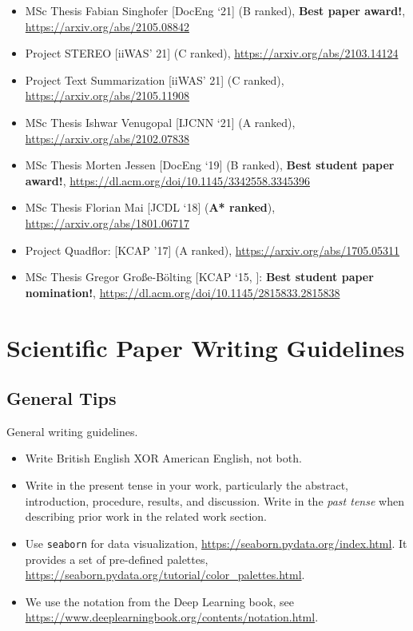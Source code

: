 \documentclass[manuscript, nonacm]{acmart}
\begin{document}
\begin{itemize}
\item MSc Thesis Fabian Singhofer [DocEng ‘21] (B ranked), \textbf{Best paper award!}, \url{https://arxiv.org/abs/2105.08842}
\item Project STEREO [iiWAS’ 21] (C ranked), \url{https://arxiv.org/abs/2103.14124}
\item Project Text Summarization [iiWAS’ 21] (C ranked), \url{https://arxiv.org/abs/2105.11908}
\item MSc Thesis Ishwar Venugopal [IJCNN ‘21] (A ranked), \url{https://arxiv.org/abs/2102.07838}
\item MSc Thesis Morten Jessen [DocEng ‘19] (B ranked), \textbf{Best student paper award!}, \url{https://dl.acm.org/doi/10.1145/3342558.3345396}
\item MSc Thesis Florian Mai [JCDL ‘18] (\textbf{A* ranked}), \url{https://arxiv.org/abs/1801.06717}
\item Project Quadflor: [KCAP '17] (A ranked), \url{https://arxiv.org/abs/1705.05311}
\item MSc Thesis Gregor Große-Bölting [KCAP ‘15, \cite{DBLP:conf/kcap/Grosse-BoltingN15}]: \textbf{Best student paper nomination!}, \url{https://dl.acm.org/doi/10.1145/2815833.2815838}
\end{itemize}

\section{Scientific Paper Writing Guidelines}
\label{app:paper-checklist}

\subsection{General Tips}
General writing guidelines.

\begin{itemize}
\item Write British English XOR American English, not both. 

\item Write in the present tense in your work, particularly the abstract, introduction, procedure, results, and discussion.
Write in the \textit{past tense} when describing prior work in the related work section.

\item Use \texttt{seaborn} for data visualization, \url{https://seaborn.pydata.org/index.html}.
It provides a set of pre-defined palettes, \url{https://seaborn.pydata.org/tutorial/color_palettes.html}.

\item We use the notation from the Deep Learning book, see \url{https://www.deeplearningbook.org/contents/notation.html}.


\end{itemize}
\end{document}
